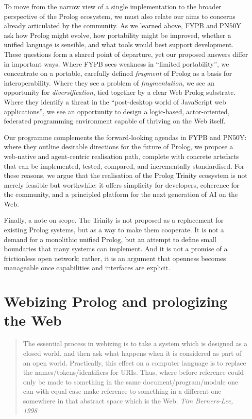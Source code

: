 To move from the narrow view of a single implementation to the broader perspective of the Prolog ecosystem, we must also relate our aims to concerns already articulated by the community. As we learned above, FYPB and PN50Y ask how Prolog might evolve, how portability might be improved, whether a unified language is sensible, and what tools would best support development. These questions form a shared point of departure, yet our proposed answers differ in important ways. Where FYPB sees weakness in ``limited portability'', we concentrate on a portable, carefully defined \emph{fragment} of Prolog as a basis for interoperability. Where they see a problem of \emph{fragmentation}, we see an opportunity for \emph{diversification}, tied together by a clear Web Prolog substrate. Where they identify a threat in the ``post-desktop world of JavaScript web applications'', we see an opportunity to design a logic-based, actor-oriented, federated programming environment capable of thriving on the Web itself.

Our programme complements the forward-looking agendas in FYPB and PN50Y: where they outline desirable directions for the future of Prolog, we propose a web-native and agent-centric realisation path, complete with concrete artefacts that can be implemented, tested, compared, and incrementally standardised. For these reasons, we argue that the realisation of the Prolog Trinity ecosystem is not merely feasible but worthwhile: it offers simplicity for developers, coherence for the community, and a principled platform for the next generation of AI on the Web.

Finally, a note on scope. The Trinity is not proposed as a replacement for existing Prolog systems, but as a way to make them cooperate. It is not a demand for a monolithic unified Prolog, but an attempt to define small boundaries that many systems can implement. And it is not a promise of a frictionless open network; rather, it is an argument that openness becomes manageable once capabilities and interfaces are explicit.


\section{Webizing Prolog and prologizing the Web}

\begin{quotation}
\noindent The essential process in webizing is to take a system which is
designed as a closed world, and then ask what happens when it is
considered as part of an open world. Practically, this effect on a
computer language is to replace the names/tokens/identifiers for URIs.
Thus, where before reference could only be made to something in the
same document/program/module one can with equal ease make reference to
something in a different one somewhere in that abstract space which is
the Web.
\vspace{-0.1cm}
\flushright  \textit{Tim Berners-Lee, 1998}
\vspace{0.1cm}
\end{quotation}

